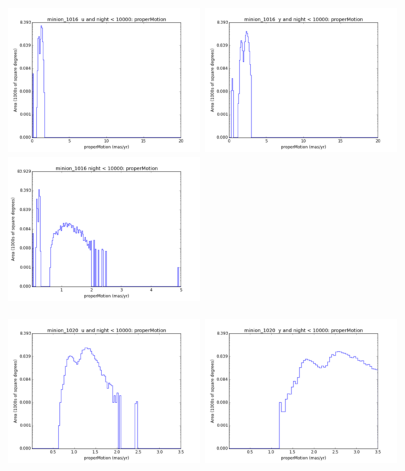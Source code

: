 \begin{figure}[ht]
  \begin{center}
  \includegraphics[width=2.0in]{./figs/milkyway/astromPanels/MW_Astrom_pmError_Baseline_u_hst.png}
  \includegraphics[width=2.0in]{./figs/milkyway/astromPanels/MW_Astrom_pmError_Baseline_y_hst.png}
  \includegraphics[width=2.0in]{./figs/milkyway/astromPanels/MW_Astrom_pmError_Baseline_10y_hst.png}
  \end{center}
  \begin{center}
  \includegraphics[width=2.0in]{./figs/milkyway/astromPanels/MW_Astrom_pmError_PanSTARRS_u_hst.png}
  \includegraphics[width=2.0in]{./figs/milkyway/astromPanels/MW_Astrom_pmError_PanSTARRS_y_hst.png}

\end{center}
\end{figure}
